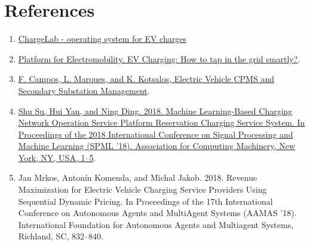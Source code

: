 \documentclass[11pt]{article}
\begin{document}
\newpage

\section{References}
\label{section:references}

\begin{enumerate}
    \item \href{https://www.chargelab.co/}{ChargeLab - operating system for EV charges}
    \item \href{https://www.platformelectromobility.eu/2022/05/17/ev-charging-how-to-tap-in-the-grid-smartly/}{Platform for Electromobility. EV Charging: How to tap in the grid smartly?}.
    \item \href{https://mobilityintegrationsymposium.org/wp-content/uploads/sites/10/2018/11/4A_3_Emob18_024_paper_Filipe_Campos.pdf}{F. Campos, L. Marques, and K. Kotsalos, Electric Vehicle CPMS and Secondary Substation Management}.
    \item \href{https://doi.org/10.1145/3297067.3297078}{Shu Su, Hui Yan, and Ning Ding. 2018. Machine Learning-Based Charging Network Operation Service Platform Reservation Charging Service System. In Proceedings of the 2018 International Conference on Signal Processing and Machine Learning (SPML '18). Association for Computing Machinery, New York, NY, USA, 1–5}.
    \item Jan Mrkos, Antonín Komenda, and Michal Jakob. 2018. Revenue Maximization for Electric Vehicle Charging Service Providers Using Sequential Dynamic Pricing. In Proceedings of the 17th International Conference on Autonomous Agents and MultiAgent Systems (AAMAS '18). International Foundation for Autonomous Agents and Multiagent Systems, Richland, SC, 832–840.
\end{enumerate}
\end{document}
